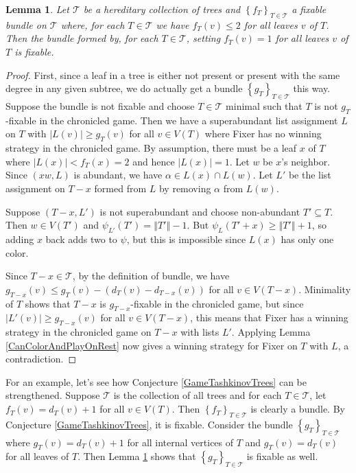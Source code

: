\documentclass[12pt,reqno]{amsart}
\theoremstyle{plain}
\newtheorem{lem}[thm]{Lemma}
\theoremstyle{definition}
\theoremstyle{remark}
\newcommand{\fancy}[1]{\mathcal{#1}}
\newcommand{\set}[1]{\left\{ #1 \right\}}
\newcommand{\card}[1]{\left|#1\right|}
\newcommand{\size}[1]{\left\Vert#1\right\Vert}
\newcommand{\parens}[1]{\left( #1 \right)}
\newcommand{\T}{\fancy{T}}
\begin{document}
\begin{lem}\label{FreeStrengthening}
Let $\T$ be a hereditary collection of trees and $\set{f_T}_{T \in \T}$ a fixable bundle on $\T$ where, for each $T \in \T$ we have $f_T(v) \le 2$ for all leaves $v$ of $T$.  Then the bundle formed by, for each $T \in \T$, setting $f_T(v) = 1$ for all leaves $v$ of $T$ is fixable.
\end{lem}
\begin{proof}
First, since a leaf in a tree is either not present or present with the same degree in any given subtree, we do actually get a bundle $\set{g_T}_{T \in \T}$ this way.  Suppose the bundle is not fixable and choose $T \in \T$ minimal such that $T$ is not $g_T$-fixable in the chronicled game.  Then we have a superabundant list assignment $L$ on $T$ with $\card{L(v)} \ge g_T(v)$ for all $v \in V(T)$ where Fixer has no winning strategy in the chronicled game.  By assumption, there must be a leaf $x$ of $T$ where $\card{L(x)} < f_T(x) = 2$ and hence $\card{L(x)} = 1$.  Let $w$ be $x$'s neighbor.  Since $(xw, L)$ is abundant, 
we have $\alpha \in L(x) \cap L(w)$.  Let $L'$ be the list assignment on $T-x$ formed from $L$ by removing $\alpha$ from $L(w)$.  

Suppose $(T-x, L')$ is not superabundant and choose non-abundant $T' \subseteq T$.  Then $w \in V(T')$ and $\psi_{L'}(T') = \size{T'} - 1$.  But $\psi_L(T' + x) \ge \size{T'} + 1$, so adding $x$ back adds two to $\psi$, but this is impossible since $L(x)$ has only one color.  

Since $T-x \in \T$, by the definition of bundle, we have $g_{T-x}(v) \le g_T(v) - \parens{d_T(v) - d_{T-x}(v)}$ for all $v \in V(T-x)$.  Minimality of $T$ shows that $T-x$ is $g_{T-x}$-fixable in the chronicled game, but since $\card{L'(v)} \ge g_{T-x}(v)$ for all $v \in V(T-x)$, this means that Fixer has a winning strategy in the chronicled game on $T-x$ with lists $L'$.  Applying Lemma \ref{CanColorAndPlayOnRest} now gives a winning strategy for Fixer on $T$ with $L$, a contradiction.
\end{proof}

For an example, let's see how Conjecture \ref{GameTashkinovTrees} can be strengthened. Suppose $\T$ is the collection of all trees and for each $T \in \T$, let $f_T(v) = d_T(v) + 1$ for all $v \in V(T)$.  Then $\set{f_T}_{T \in \T}$ is clearly a bundle.  By Conjecture \ref{GameTashkinovTrees}, it is fixable.  Consider the bundle $\set{g_T}_{T \in \T}$ where $g_T(v) = d_T(v) + 1$ for all internal vertices of $T$ and $g_T(v) = d_T(v)$ for all leaves of $T$. Then Lemma \ref{FreeStrengthening} shows that $\set{g_T}_{T \in \T}$ is fixable as well.
\end{document}
